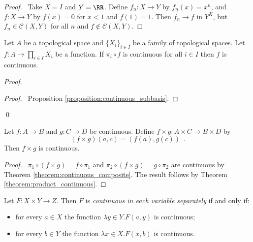 \begin{proof}
    \pf\ Take $X = I$ and $Y = \RR$. Define $f_n : X \rightarrow Y$ by $f_n(x) = x^n$, and $f : X \rightarrow Y$ by
    $f(x) = 0$ for $x < 1$ and $f(1) = 1$. Then $f_n \rightarrow f$ in $Y^X$, but $f_n \in \mathcal{C}(X,Y)$ for all $n$
    and $f \notin \mathcal{C}(X,Y)$.
\end{proof}

\begin{theorem}
    \label{theorem:product_continuous}
        Let $A$ be a topological space and $\{ X_i \}_{i \in I}$ be a family of topological spaces. Let $f : A \rightarrow \prod_{i \in I} X_i$ be a function.
        If $\pi_i \circ f$ is continuous for all $i \in I$ then $f$ is continuous.
\end{theorem}

\begin{proof}
    \pf
    \qedstep
    \begin{proof}
        \pf\ Proposition \ref{proposition:continuous_subbasis}.
    \end{proof}
    \qed
\end{proof}

\begin{proposition}
    Let $f : A \rightarrow B$ and $g : C \rightarrow D$ be continuous. Define $f \times g : A \times C \rightarrow B \times D$ by
    \[ (f \times g)(a,c) = (f(a), g(c)) \enspace . \]
    Then $f \times g$ is continuous.
\end{proposition}

\begin{proof}
    \pf\ $\pi_1 \circ (f \times g) = f \circ \pi_1$ and $\pi_2 \circ (f \times g) = g \circ \pi_2$ are continuous
    by Theorem \ref{theorem:continuous_composite}. The result follows by Theorem \ref{theorem:product_continuous}.
\end{proof}

\begin{definition}
    Let $F : X \times Y \rightarrow Z$. Then $F$ is \emph{continuous in each
    variable separately} if and only if:
    \begin{itemize}
        \item for every $a \in X$ the function $\lambda y \in Y. F(a,y)$ is continuous;
        \item for every $b \in Y$ the function $\lambda x \in X. F(x,b)$ is continuous.
    \end{itemize}
\end{definition}


